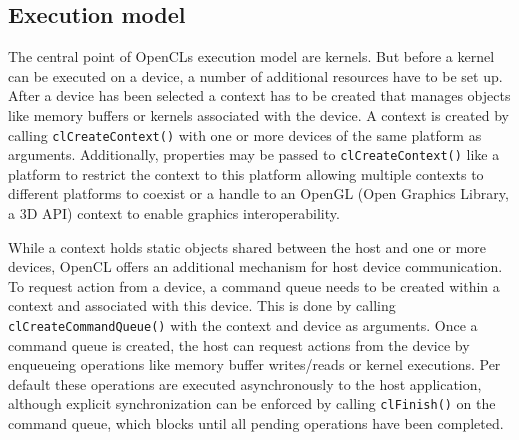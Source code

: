 \subsection{Execution model}
\label{sec:execution_model}
The central point of OpenCLs execution model are kernels. But before a kernel can be executed on a device, a number of additional resources have to be set up.
After a device has been selected a context has to be created that manages objects like memory buffers or kernels associated with the device. A context is created by calling \lstinline!clCreateContext()! with one or more devices of the same platform as arguments. Additionally, properties may be passed to \lstinline!clCreateContext()! like a platform to restrict the context to this platform allowing multiple contexts to different platforms to coexist or a handle to an OpenGL (Open Graphics Library, a 3D API) context to enable graphics interoperability. \cite[p.22]{opencl_book}

While a context holds static objects shared between the host and one or more devices, OpenCL offers an additional mechanism for host device communication. To request action from a device, a command queue needs to be created within a context and associated with this device. This is done by calling \lstinline!clCreateCommandQueue()! with the context and device as arguments. Once a command queue is created, the host can request actions from the device by enqueueing operations like memory buffer writes/reads or kernel executions. Per default these operations are executed asynchronously to the host application, although explicit synchronization can be enforced by calling \lstinline!clFinish()! on the command queue, which blocks until all pending operations have been completed. \cite[p.22, 23, 26]{opencl_book}

